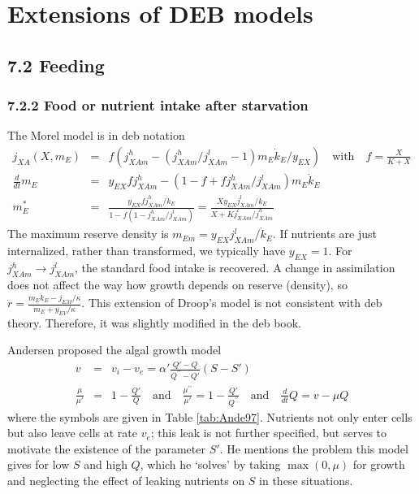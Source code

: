 \chapter{Extensions of DEB models}
\label{ch_c:extensions}

\section*{7.2 Feeding}
{}
\label{sec_c:feeding_ext}

\subsection*{7.2.2 Food or nutrient intake after starvation} 
{}
\label{ssec_c:hyperphagia}

The Morel \cite{More87} model is in {\sc deb} notation
\begin{eqnarray}
  j_{XA}(X,m_E) &=& f \left( j_{XAm}^h - 
      (j_{XAm}^h/ j_{XAm}^l - 1) m_E \dot{k}_E/ y_{EX} \right) 
      \quad \mbox{with} \quad f = \frac{X} {K + X}
  \\
  \frac{d} {dt} m_E &=& y_{EX} f j_{XAm}^h 
      - (1 - f + f j_{XAm}^h/ j_{XAm}^l) m_E \dot{k}_E
  \\
  m_E^* &=& \frac{y_{EX} f j_{XAm}^h/ \dot{k}_E} 
      {1 - f (1 - j_{XAm}^h/ j_{XAm}^l)} 
    = \frac{X y_{EX} j_{XAm}^l/ \dot{k}_E} {X + K j_{XAm}^l/ j_{XAm}^h}
\end{eqnarray}
The maximum reserve density is $m_{Em} = y_{EX} j_{XAm}^l/ \dot{k}_E$.
If nutrients are just internalized, rather than transformed, we typically have $y_{EX} = 1$. 
For $j_{XAm}^h \rightarrow j_{XAm}^l$, the standard food intake is recovered. 
A change in assimilation does not affect the way how growth depends on reserve (density), so 
$\dot{r} = \frac{m_E \dot{k}_E - j_{EM}/ \kappa} {m_E + y_{EV}/ \kappa}$. 
This extension of Droop's model is not consistent with {\sc deb} theory. 
Therefore, it was slightly modified in the {\sc deb} book.

Andersen \cite{Ande97} proposed the algal growth model
\begin{eqnarray*}
 v &=& v_i - v_e = \alpha' \frac{Q' - Q} {Q^{\prime \prime} - Q'} (S - S')
 \\
 \frac{\mu} {\mu'} &=& 1 - \frac{Q'} {Q} \quad \mbox{and} \quad
 \frac{\mu^{\prime \prime}} {\mu'} = 1 - \frac{Q'} {Q^{\prime \prime}} \quad \mbox{and} \quad
 \frac{d} {dt} Q = v - \mu Q
\end{eqnarray*}
where the symbols are given in Table \ref{tab:Ande97}. 
Nutrients not only enter cells but also leave cells at rate $v_e$;
this leak is not further specified, but serves to motivate the existence of the parameter $S'$.
He mentions the problem this model gives for low $S$ and high $Q$, which he `solves' by taking $\max(0, \mu)$ for growth and neglecting the effect of leaking nutrients on $S$ in these situations.

